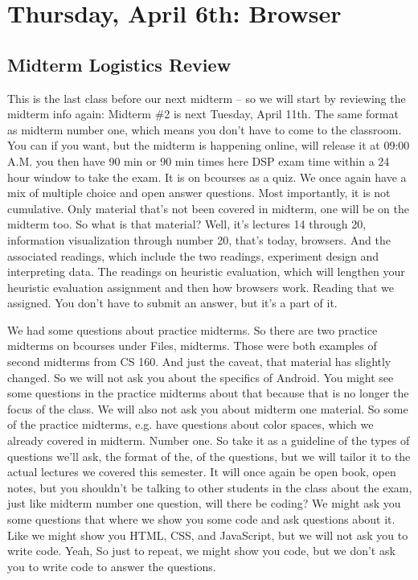 \section{Thursday, April 6th: Browser}
\subsection{Midterm Logistics Review}
This is the last class before our next midterm -- so we will start by reviewing the midterm info again: Midterm \#2 is next Tuesday, April 11th. The same format as midterm number one, which means you don't have to come to the classroom. You can if you want, but the midterm is happening online, will release it at 09:00 A.M. you then have 90 min or 90 min times here DSP exam time within a 24 hour window to take the exam. It is on bcourses as a quiz. We once again have a mix of multiple choice and open answer questions. Most importantly, it is not cumulative. Only material that's not been covered in midterm, one will be on the midterm too. So what is that material? Well, it's lectures 14 through 20, information visualization through number 20, that's today, browsers. And the associated readings, which include the two readings, experiment design and interpreting data. The readings on heuristic evaluation, which will lengthen your heuristic evaluation assignment and then how browsers work. Reading that we assigned. You don't have to submit an answer, but it's a part of it. 

We had some questions about practice midterms. So there are two practice midterms on bcourses under Files, midterms. Those were both examples of second midterms from CS 160. And just the caveat, that material has slightly changed. So we will not ask you about the specifics of Android. You might see some questions in the practice midterms about that because that is no longer the focus of the class. We will also not ask you about midterm one material. So some of the practice midterms, e.g. have questions about color spaces, which we already covered in midterm. Number one. So take it as a guideline of the types of questions we'll ask, the format of the, of the questions, but we will tailor it to the actual lectures we covered this semester. It will once again be open book, open notes, but you shouldn't be talking to other students in the class about the exam, just like midterm number one question, will there be coding? We might ask you some questions that where we show you some code and ask questions about it. Like we might show you HTML, CSS, and JavaScript, but we will not ask you to write code. Yeah, So just to repeat, we might show you code, but we don't ask you to write code to answer the questions. 
